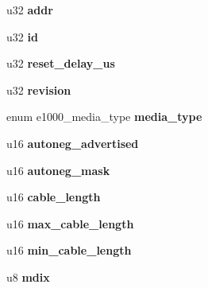 \begin{DoxyCompactItemize}
\item 
\hypertarget{structe1000__phy__info_affa9ad1e5d4e3dbde657cd4560705dc5}{
u32 {\bfseries addr}}
\label{structe1000__phy__info_affa9ad1e5d4e3dbde657cd4560705dc5}

\item 
\hypertarget{structe1000__phy__info_a01b896c7e29e7cd831d81eae6b40e55c}{
u32 {\bfseries id}}
\label{structe1000__phy__info_a01b896c7e29e7cd831d81eae6b40e55c}

\item 
\hypertarget{structe1000__phy__info_a0e8165cb75f6b6dcf79ad25d1efe8754}{
u32 {\bfseries reset\_\-delay\_\-us}}
\label{structe1000__phy__info_a0e8165cb75f6b6dcf79ad25d1efe8754}

\item 
\hypertarget{structe1000__phy__info_a73e2c0123d84d3b6e337da7cd914a3d3}{
u32 {\bfseries revision}}
\label{structe1000__phy__info_a73e2c0123d84d3b6e337da7cd914a3d3}

\item 
\hypertarget{structe1000__phy__info_a6c7bf5b5de1d6beba7307c2e4b42a4a2}{
enum e1000\_\-media\_\-type {\bfseries media\_\-type}}
\label{structe1000__phy__info_a6c7bf5b5de1d6beba7307c2e4b42a4a2}

\item 
\hypertarget{structe1000__phy__info_a7c86a5da3299cfb911e8317a872f7daf}{
u16 {\bfseries autoneg\_\-advertised}}
\label{structe1000__phy__info_a7c86a5da3299cfb911e8317a872f7daf}

\item 
\hypertarget{structe1000__phy__info_ad1f75faa123fb591ca9341731cb38dce}{
u16 {\bfseries autoneg\_\-mask}}
\label{structe1000__phy__info_ad1f75faa123fb591ca9341731cb38dce}

\item 
\hypertarget{structe1000__phy__info_a76c285a1992279d8da4ea5df3700fd94}{
u16 {\bfseries cable\_\-length}}
\label{structe1000__phy__info_a76c285a1992279d8da4ea5df3700fd94}

\item 
\hypertarget{structe1000__phy__info_a39d7a691a57e4b5d41559302fa9c42e0}{
u16 {\bfseries max\_\-cable\_\-length}}
\label{structe1000__phy__info_a39d7a691a57e4b5d41559302fa9c42e0}

\item 
\hypertarget{structe1000__phy__info_a4ea9e1fd48794ca80704ab80bdb0f33c}{
u16 {\bfseries min\_\-cable\_\-length}}
\label{structe1000__phy__info_a4ea9e1fd48794ca80704ab80bdb0f33c}

\item 
\hypertarget{structe1000__phy__info_afbc996873e6a845e53d0c1d41effa0d3}{
u8 {\bfseries mdix}}
\label{structe1000__phy__info_afbc996873e6a845e53d0c1d41effa0d3}


\end{DoxyCompactItemize}
